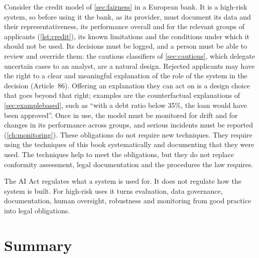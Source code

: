 Consider the credit model of \cref{sec:fairness} in a European bank. It is a high-risk system, so before using it the bank, as
its provider, must document its data and their representativeness, its performance overall and for the relevant groups of
applicants (\cref{lst:credit}), its known limitations and the conditions under which it should not be used. Its decisions must be
logged, and a person must be able to review and override them: the cautious classifiers of \cref{sec:cautious}, which
delegate uncertain cases to an analyst, are a natural design. Rejected applicants may have the right to a clear and meaningful
explanation of the role of the system in the decision (Article~86). Offering an explanation they can act on is a design choice that goes beyond that right; examples are the
counterfactual explanations of \cref{sec:examplebased}, such as ``with a debt ratio below 35\%, the loan would have been approved''. Once in use, the model must be monitored for drift and for changes in its performance across groups, and serious
incidents must be reported (\cref{ch:monitoring}). These obligations do not require new techniques. They require using the
techniques of this book systematically and documenting that they were used. The techniques help to meet the
obligations, but they do not replace conformity assessment, legal documentation and the procedures the law requires.

\begin{keyidea}
The AI Act regulates what a system is used for. It does not regulate how the system is built. For high-risk uses it turns evaluation, data governance,
documentation, human oversight, robustness and monitoring from good practice into legal obligations.
\end{keyidea}

\section{Summary}\label{sec:summary3}

